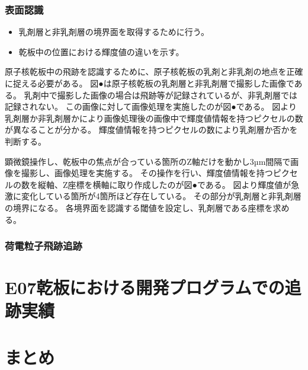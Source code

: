 \documentclass[12pt,a4paper]{jarticle}
\begin{document}
\subsubsection{表面認識}
\begin{itemize}
    \item 乳剤層と非乳剤層の境界面を取得するために行う。
    \item 乾板中の位置における輝度値の違いを示す。
\end{itemize}
原子核乾板中の飛跡を認識するために、原子核乾板の乳剤と非乳剤の地点を正確に捉える必要がある。
図●は原子核乾板の乳剤層と非乳剤層で撮影した画像である。
乳剤中で撮影した画像の場合は飛跡等が記録されているが、非乳剤層では記録されない。
この画像に対して画像処理を実施したのが図●である。
図より乳剤層か非乳剤層かにより画像処理後の画像中で輝度値情報を持つピクセルの数が異なることが分かる。
輝度値情報を持つピクセルの数により乳剤層か否かを判断する。
\par
顕微鏡操作し、乾板中の焦点が合っている箇所のZ軸だけを動かし3µm間隔で画像を撮影し、画像処理を実施する。
その操作を行い、輝度値情報を持つピクセルの数を縦軸、Z座標を横軸に取り作成したのが図●である。
図より輝度値が急激に変化している箇所が4箇所ほど存在している。
その部分が乳剤層と非乳剤層の境界になる。
各境界面を認識する閾値を設定し、乳剤層である座標を求める。
\subsubsection{荷電粒子飛跡追跡}

\newpage
\section{E07乾板における開発プログラムでの追跡実績}

\newpage
\section{まとめ}
\end{document}
